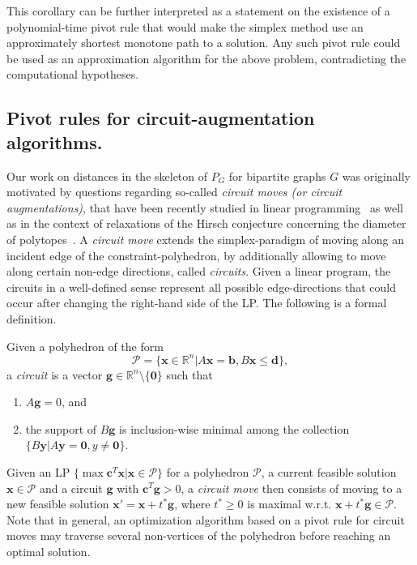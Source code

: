 \documentclass[runningheads]{llncs}
\begin{document}
This corollary can be further interpreted as a statement on the existence of a polynomial-time pivot rule that would make the simplex method use an approximately shortest monotone path to a solution. Any such pivot rule could be used as an approximation algorithm for the above problem, contradicting the computational hypotheses.

\subsection{Pivot rules for circuit-augmentation algorithms.} 
Our work on distances in the skeleton of $P_G$ for bipartite graphs $G$ was originally motivated by questions regarding so-called \emph{circuit moves (or circuit augmentations)}, that have been recently studied in linear programming~\cite{BV22,DKS22,LHL15} as well as in the context of relaxations of the Hirsch conjecture concerning the diameter of polytopes~\cite{BFH15,KPS19}. A \emph{circuit move} extends the simplex-paradigm of moving along an incident edge of the constraint-polyhedron, by additionally allowing to move along certain non-edge directions, called \emph{circuits}. Given a linear program, the circuits in a well-defined sense represent all possible edge-directions that could occur after changing the right-hand side of the LP. The following is a formal definition. 

\begin{definition}\label{def:move}
Given a polyhedron of the form  $$\mathcal{P}=\{\mathbf{x}\in \mathbb{R}^n|A\mathbf{x}=\mathbf{b}, B\mathbf{x} \le \mathbf{d}\},$$ a \emph{circuit} is a vector $\mathbf{g} \in \mathbb{R}^n\setminus \{\mathbf{0}\}$ such that
\begin{enumerate}
    \item $A\mathbf{g}=0$, and
    \item the support of $B\mathbf{g}$ is inclusion-wise minimal among the collection $\{B\mathbf{y}|A\mathbf{y}=\mathbf{0}, y \neq \mathbf{0}\}$.
\end{enumerate}
\end{definition}

Given an LP $\{\max \mathbf{c}^T\mathbf{x}|\mathbf{x} \in \mathcal{P}\}$ for a polyhedron $\mathcal{P}$, a current feasible solution $\mathbf{x} \in \mathcal{P}$ and a circuit $\mathbf{g}$ with $\mathbf{c}^T\mathbf{g}>0$, a \emph{circuit move} then consists of moving to a new feasible solution $\mathbf{x}'=\mathbf{x}+t^\ast \mathbf{g}$, where $t^\ast \ge 0$ is maximal w.r.t. $\mathbf{x}+t^\ast \mathbf{g} \in \mathcal{P}$. Note that in general, an optimization algorithm based on a pivot rule for circuit moves may traverse several non-vertices of the polyhedron before reaching an optimal solution. 
\end{document}
